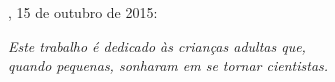 \documentclass[
	10pt,				%
	openright,			%
	twoside,			%
	a4paper,			%
	chapter=TITLE,		%
	english,			%
	brazil				%
	]{abntex2}
\begin{document}

%
% 
%
\begin{folhadeaprovacao}

  \begin{center}
    {\ABNTEXchapterfont\large\MakeUppercase{\imprimirautor}}

    \vspace*{\fill}\vspace*{\fill}
    \begin{center}
      \ABNTEXchapterfont\bfseries\Large\MakeUppercase{\imprimirtitulo}
    \end{center}
    \vspace*{\fill}
    
    \imprimirtextoaprovacao
     
    \vspace*{1cm}
    
	\imprimirlocal, 15 de outubro de 2015:

    \vspace*{\fill}

   \end{center}
        


      
    \vspace*{1cm}  
  
\end{folhadeaprovacao}

\begin{dedicatoria}
   \vspace*{\fill}
   \begin{flushright}
   \noindent
   \textit{ Este trabalho é dedicado às crianças adultas que,\\
   quando pequenas, sonharam em se tornar cientistas.}\vspace*{2cm}
   \end{flushright}
\end{dedicatoria}
\end{document}
